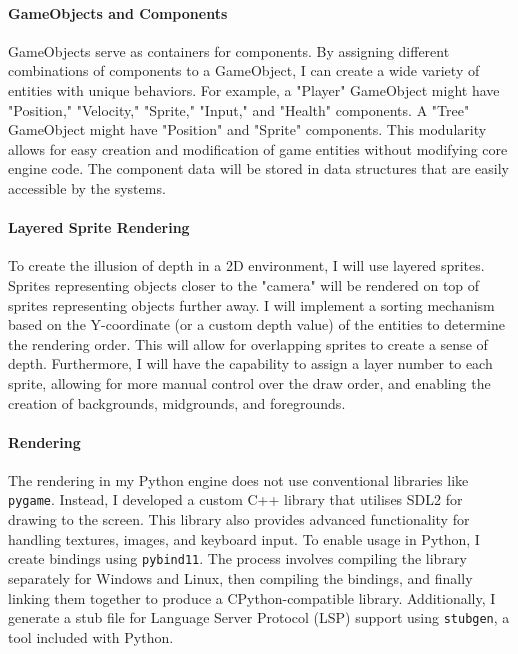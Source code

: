 \documentclass{article}
\begin{document}
\paragraph{GameObjects and Components}
GameObjects serve as containers for components. By assigning different combinations of components to a GameObject, I can create a wide variety of entities with unique behaviors. For example, a "Player" GameObject might have "Position," "Velocity," "Sprite," "Input," and "Health" components. A "Tree" GameObject might have "Position" and "Sprite" components. This modularity allows for easy creation and modification of game entities without modifying core engine code. The component data will be stored in data structures that are easily accessible by the systems.

\paragraph{Layered Sprite Rendering}
To create the illusion of depth in a 2D environment, I will use layered sprites. Sprites representing objects closer to the "camera" will be rendered on top of sprites representing objects further away. I will implement a sorting mechanism based on the Y-coordinate (or a custom depth value) of the entities to determine the rendering order. This will allow for overlapping sprites to create a sense of depth. Furthermore, I will have the capability to assign a layer number to each sprite, allowing for more manual control over the draw order, and enabling the creation of backgrounds, midgrounds, and foregrounds.

\paragraph{Rendering}
 The rendering in my Python engine does not use conventional libraries like \verb|pygame|. Instead, I developed a custom C++ library that utilises SDL2 for drawing to the screen. This library also provides advanced functionality for handling textures, images, and keyboard input. To enable usage in Python, I create bindings using \verb|pybind11|. The process involves compiling the library separately for Windows and Linux, then compiling the bindings, and finally linking them together to produce a CPython-compatible library. Additionally, I generate a stub file for Language Server Protocol (LSP) support using \verb|stubgen|, a tool included with Python.
\end{document}
